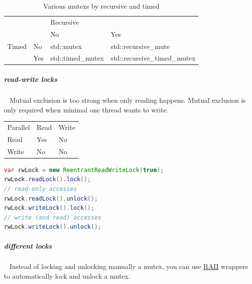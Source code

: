 \documentclass[11pt,twoside,landscape]{article}
\begin{document}
\begin{multicols}{2}
\begin{table}[htbp]
\caption{\label{tbl:various-mutexs-by-recursive-and-timed}Various mutexs by recursive and timed}
\centering
\begin{tabular}{|l|l|l|l|}
\hline
\multicolumn{2}{|l|}{} & \multicolumn{2}{l|}{Recursive} \\
\cline{3-4}
\multicolumn{2}{|l|}{} & No & Yes \\
\hline
Timed & No & std::mutex & std::recursive\_mute \\
\cline{2-4}
 & Yes & std::timed\_mutex & std::recursive\_timed\_mutex \\
\hline
\end{tabular}
\end{table}

\subparagraph{read-write locks} \
\label{sec:org3622f3d}
Mutual exclusion is too strong when only reading happens.
Mutual exclusion is only required when minimal one thread wants to write.

\begin{center}
\begin{tabular}{lll}
Parallel & Read & Write\\[0pt]
Read & Yes & No\\[0pt]
Write & No & No\\[0pt]
\end{tabular}
\end{center}


\begin{lstlisting}[language=java,numbers=none]
var rwLock = new ReentrantReadWriteLock(true);
rwLock.readLock().lock();
// read-only accesses
rwLock.readLock().unlock();
rwLock.writeLock().lock();
// write (and read) accesses
rwLock.writeLock().unlock();
\end{lstlisting}

\subparagraph{different locks} \
\label{sec:orgd22d276}
Instead of locking and unlocking manually a mutex, you can use \href{../../../roam/20220118172628-resource_acquisition_is_initialization.org}{RAII} wrappers to automatically lock and unlock a mutex.


\end{multicols}
\end{document}
